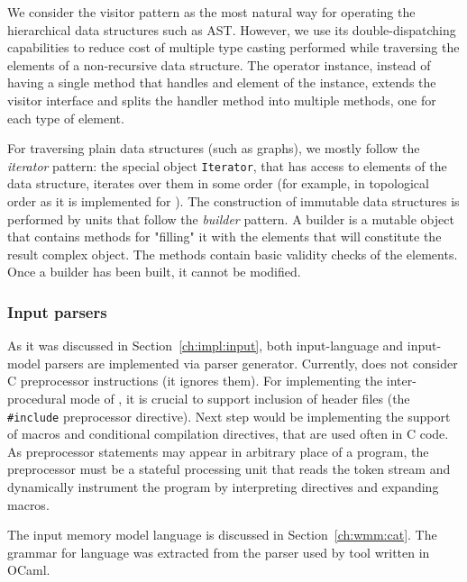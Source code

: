 We consider the visitor pattern as the most natural way for operating the hierarchical data structures such as AST.
However, we use its double-dispatching capabilities to reduce cost of multiple type casting performed while traversing the elements of a non-recursive data structure.
The operator instance, instead of having a single method that handles and element of the instance, extends the visitor interface and splits the handler method into multiple methods, one for each type of element.

For traversing plain data structures (such as graphs), we mostly follow the \textit{iterator} pattern: the special object \texttt{Iterator}, that has access to elements of the data structure, iterates over them in some order (for example, in topological order as it is implemented for \xgraph{}).
The construction of immutable data structures is performed by units that follow the \textit{builder} pattern.
A builder is a mutable object that contains methods for "filling" it with the elements that will constitute the result complex object.
The methods contain basic validity checks of the elements.
Once a builder has been built, it cannot be modified.


\subsubsection{Input parsers}
\label{ch:impl:proc:input-parser}

As it was discussed in Section~\ref{ch:impl:input}, both input-language and input-model parsers are implemented via  parser generator.
Currently, \porthos[2] does not consider C preprocessor instructions (it ignores them).
For implementing the inter-procedural mode of \porthos{}, it is crucial to support inclusion of header files (the \texttt{\#include} preprocessor directive).
Next step would be implementing the support of macros and conditional compilation directives, that are used often in C code.
As preprocessor statements may appear in arbitrary place of a program, the preprocessor must be a stateful processing unit that reads the token stream and dynamically instrument the program by interpreting directives and expanding macros.

The input memory model language \cat{} is discussed in Section~\ref{ch:wmm:cat}.
The  grammar for \cat{} language was extracted from the parser used by  tool%
%
%
written in OCaml.


